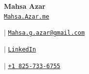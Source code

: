 \documentclass[10pt]{article}
\newlength{\CVHeaderNameGap}
\newlength{\CVHeaderAfterSpace}
\newcommand{\CVLink}[3]{%
  \href{#1}{%
    \ifblank{#2}{}{\faIcon{#2}\ }%
    #3%
  }%
}
\newcommand{\CVHeader}[2]{%
  \begin{center}
    \textbf{\Huge #1}\\[\CVHeaderNameGap]
    \small #2
    \\[\CVHeaderAfterSpace]
  \end{center}
}
\newcommand{\CVHeaderItem}[3]{%
  \CVLink{#1}{#2}{\texttt{#3}}%
}
\newcommand{\CVHeaderSeparator}{\hspace{4pt}$|$\hspace{4pt}}
\begin{document}
\begin{preview}
\noindent
\begin{minipage}{180mm}

\CVHeader
  {Mahsa Azar}
  {%
    \CVHeaderItem{https://mahsaazar.framer.website/}{}{Mahsa.Azar.me}
    \CVHeaderSeparator
    \CVHeaderItem{mailto:Mahsa.g.azar@gmail.com}{}{Mahsa.g.azar@gmail.com}
    \CVHeaderSeparator
    \CVHeaderItem{https://www.linkedin.com/in/mahsa-g-azar}{}{LinkedIn}
    \CVHeaderSeparator
    \CVHeaderItem{tel:+18257336755}{}{+1 825-733-6755}
  }


\end{minipage}
\end{preview}
\end{document}
